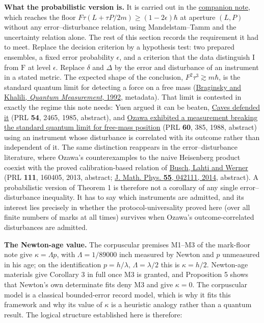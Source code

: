 \documentclass[11pt,a4paper]{article}
\begin{document}
\textbf{What the probabilistic version is.} It is carried out in the
\href{planck-gap-probabilistic.md}{companion note}, which reaches the
floor \(F\tau(L+\tau P/2m)\ge(1-2\epsilon)\hbar\) at aperture \((L,P)\)
without any error--disturbance relation, using Mandelstam--Tamm and the
uncertainty relation alone. The rest of this section records the
requirement it had to meet. Replace the decision criterion by a
hypothesis test: two prepared ensembles, a fixed error probability
\(\epsilon\), and a criterion that the data distinguish \(\mathrm I\)
from \(\mathrm F\) at level \(\epsilon\). Replace \(\delta\) and
\(\Delta\) by the error and disturbance of an instrument in a stated
metric. The expected shape of the conclusion,
\(F^2\tau^3\gtrsim m\hbar\), is the standard quantum limit for detecting
a force on a free mass
(\href{https://doi.org/10.1017/CBO9780511622748}{Braginsky and Khalili,
\emph{Quantum Measurement}, 1992}, metadata). That limit is contested in
exactly the regime this note needs: Yuen argued it can be beaten,
\href{https://doi.org/10.1103/PhysRevLett.54.2465}{Caves defended it}
(PRL \textbf{54}, 2465, 1985, abstract), and
\href{https://doi.org/10.1103/PhysRevLett.60.385}{Ozawa exhibited a
measurement breaking the standard quantum limit for free-mass position}
(PRL \textbf{60}, 385, 1988, abstract) using an instrument whose
disturbance is correlated with its outcome rather than independent of
it. The same distinction reappears in the error--disturbance literature,
where Ozawa's counterexamples to the naive Heisenberg product coexist
with the proved calibration-based relation of
\href{https://doi.org/10.1103/PhysRevLett.111.160405}{Busch, Lahti and
Werner} (PRL \textbf{111}, 160405, 2013, abstract;
\href{https://doi.org/10.1063/1.4871444}{J. Math. Phys. \textbf{55},
042111, 2014}, abstract). A probabilistic version of Theorem 1 is
therefore not a corollary of any single error--disturbance inequality.
It has to say which instruments are admitted, and its interest lies
precisely in whether the protocol-universality proved here (over all
finite numbers of marks at all times) survives when Ozawa's
outcome-correlated disturbances are admitted.

\textbf{The Newton-age value.} The corpuscular premises M1--M3 of the
mark-floor note give \(\kappa=\Lambda p\), with \(\Lambda=1/89000\) inch
measured by Newton and \(p\) unmeasured in his age; on the
identification \(p=h/\lambda\), \(\Lambda=\lambda/2\) this is
\(\kappa=h/2\). Newton-age materials give Corollary 3 in full once M3 is
granted, and Proposition 5 shows that Newton's own determinate fits deny
M3 and give \(\kappa=0\). The corpuscular model is a classical
bounded-error record model, which is why it fits this framework and why
its value of \(\kappa\) is a heuristic analogy rather than a quantum
result. The logical structure established here is therefore:
\end{document}
